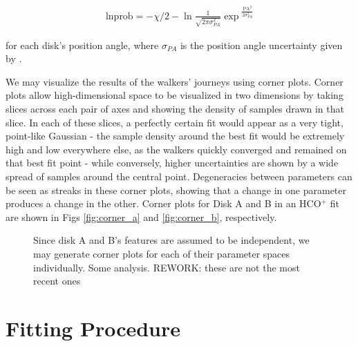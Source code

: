 \begin{align}
  \text{lnprob} = -\chi/2  -\ln{\frac{1}{\sqrt{2 \pi \sigma_{PA}^2}}} \exp{^{\frac{\text{PA}^2}{2 \sigma_{PA}^2}}}
\end{align}

\noindent
for each disk's position angle, where $\sigma_{PA}$ is the position angle uncertainty given by \citet{Williams2014}.



We may visualize the results of the walkers' journeys using corner plots. Corner plots allow high-dimensional space to be visualized in two dimensions by taking slices across each pair of axes and showing the density of samples drawn in that slice. In each of these slices, a perfectly certain fit would appear as a very tight, point-like Gaussian - the sample density around the best fit would be extremely high and low everywhere else, as the walkers quickly converged and remained on that best fit point - while conversely, higher uncertainties are shown by a wide spread of samples around the central point. Degeneracies between parameters can be seen as streaks in these corner plots, showing that a change in one parameter produces a change in the other. Corner plots for Disk A and B in an HCO$^+$ fit are shown in Figs \ref{fig:corner_a} and \ref{fig:corner_b}, respectively.


\begin{figure}[htp]
  \hspace*{\fill}%
  \hfill%
  \hspace*{\fill}%
  \caption{Since disk A and B's features are assumed to be independent, we may generate corner plots for each of their parameter spaces individually. Some analysis. REWORK: these are not the most recent ones}
  \label{fig:corner_plots}
\end{figure}





\section{Fitting Procedure}
\label{section:fitting_procedure}

